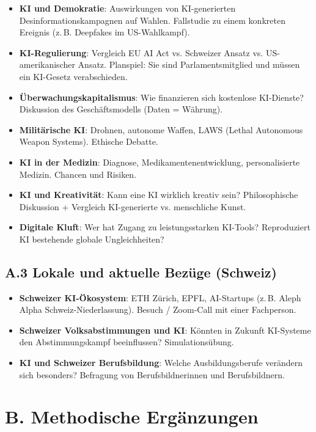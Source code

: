\begin{itemize}
    \item \textbf{KI und Demokratie}: Auswirkungen von KI-generierten
          Desinformationskampagnen auf Wahlen. Fallstudie zu einem konkreten
          Ereignis (z.\,B. Deepfakes im US-Wahlkampf).
    \item \textbf{KI-Regulierung}: Vergleich EU AI Act vs. Schweizer Ansatz
          vs. US-amerikanischer Ansatz. Planspiel: Sie sind Parlamentsmitglied
          und müssen ein KI-Gesetz verabschieden.
    \item \textbf{Überwachungskapitalismus}: Wie finanzieren sich kostenlose
          KI-Dienste? Diskussion des Geschäftsmodells (Daten = Währung).
    \item \textbf{Militärische KI}: Drohnen, autonome Waffen, LAWS (Lethal
          Autonomous Weapon Systems). Ethische Debatte.
    \item \textbf{KI in der Medizin}: Diagnose, Medikamentenentwicklung,
          personalisierte Medizin. Chancen und Risiken.
    \item \textbf{KI und Kreativität}: Kann eine KI wirklich kreativ sein?
          Philosophische Diskussion + Vergleich KI-generierte vs. menschliche Kunst.
    \item \textbf{Digitale Kluft}: Wer hat Zugang zu leistungsstarken KI-Tools?
          Reproduziert KI bestehende globale Ungleichheiten?
\end{itemize}

\subsection*{A.3 Lokale und aktuelle Bezüge (Schweiz)}

\begin{itemize}
    \item \textbf{Schweizer KI-Ökosystem}: ETH Zürich, EPFL, AI-Startups
          (z.\,B. Aleph Alpha Schweiz-Niederlassung). Besuch / Zoom-Call
          mit einer Fachperson.
    \item \textbf{Schweizer Volksabstimmungen und KI}: Könnten in Zukunft
          KI-Systeme den Abstimmungskampf beeinflussen?
          Simulationsübung.
    \item \textbf{KI und Schweizer Berufsbildung}: Welche Ausbildungsberufe
          verändern sich besonders? Befragung von Berufsbildnerinnen
          und Berufsbildnern.
\end{itemize}

\section*{B. Methodische Ergänzungen}

